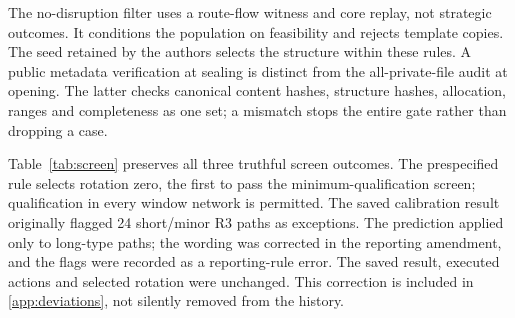 \documentclass[preprint,11pt,authoryear]{elsarticle}
\begin{document}
The no-disruption filter uses a route-flow witness and core replay, not strategic outcomes. It conditions the population on feasibility and rejects template copies. The seed retained by the authors selects the structure within these rules. A public metadata verification at sealing is distinct from the all-private-file audit at opening. The latter checks canonical content hashes, structure hashes, allocation, ranges and completeness as one set; a mismatch stops the entire gate rather than dropping a case.

Table~\ref{tab:screen} preserves all three truthful screen outcomes. The prespecified rule selects rotation zero, the first to pass the minimum-qualification screen; qualification in every window network is permitted. The saved calibration result originally flagged 24 short/minor R3 paths as exceptions. The prediction applied only to long-type paths; the wording was corrected in the reporting amendment, and the flags were recorded as a reporting-rule error. The saved result, executed actions and selected rotation were unchanged. This correction is included in \ref{app:deviations}, not silently removed from the history.
\end{document}
